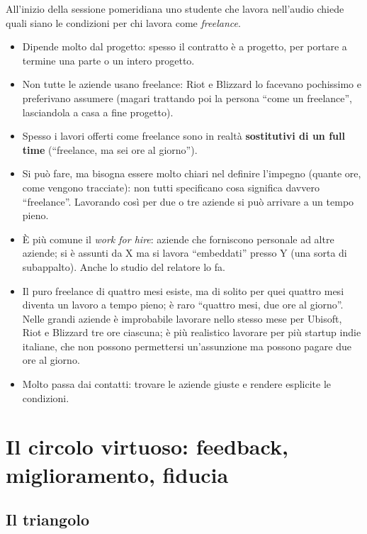 All'inizio della sessione pomeridiana uno studente che lavora nell'audio
chiede quali siano le condizioni per chi lavora come \emph{freelance}.
\begin{itemize}
  \item Dipende molto dal progetto: spesso il contratto è a progetto, per
        portare a termine una parte o un intero progetto.
  \item Non tutte le aziende usano freelance: Riot e Blizzard lo facevano
        pochissimo e preferivano assumere (magari trattando poi la persona
        ``come un freelance'', lasciandola a casa a fine progetto).
  \item Spesso i lavori offerti come freelance sono in realtà
        \textbf{sostitutivi di un full time} (``freelance, ma sei ore al
        giorno'').
  \item Si può fare, ma bisogna essere molto chiari nel definire l'impegno
        (quante ore, come vengono tracciate): non tutti specificano cosa
        significa davvero ``freelance''. Lavorando così per due o tre aziende
        si può arrivare a un tempo pieno.
  \item È più comune il \emph{work for hire}: aziende che forniscono personale
        ad altre aziende; si è assunti da X ma si lavora ``embeddati'' presso
        Y (una sorta di subappalto). Anche lo studio del relatore lo fa.
  \item Il puro freelance di quattro mesi esiste, ma di solito per quei
        quattro mesi diventa un lavoro a tempo pieno; è raro ``quattro mesi,
        due ore al giorno''. Nelle grandi aziende è improbabile lavorare nello
        stesso mese per Ubisoft, Riot e Blizzard tre ore ciascuna; è più
        realistico lavorare per più startup indie italiane, che non possono
        permettersi un'assunzione ma possono pagare due ore al giorno.
  \item Molto passa dai contatti: trovare le aziende giuste e rendere esplicite
        le condizioni.
\end{itemize}

\section{Il circolo virtuoso: feedback, miglioramento, fiducia}
\label{sec:z1-triangolo}

\subsection{Il triangolo}

